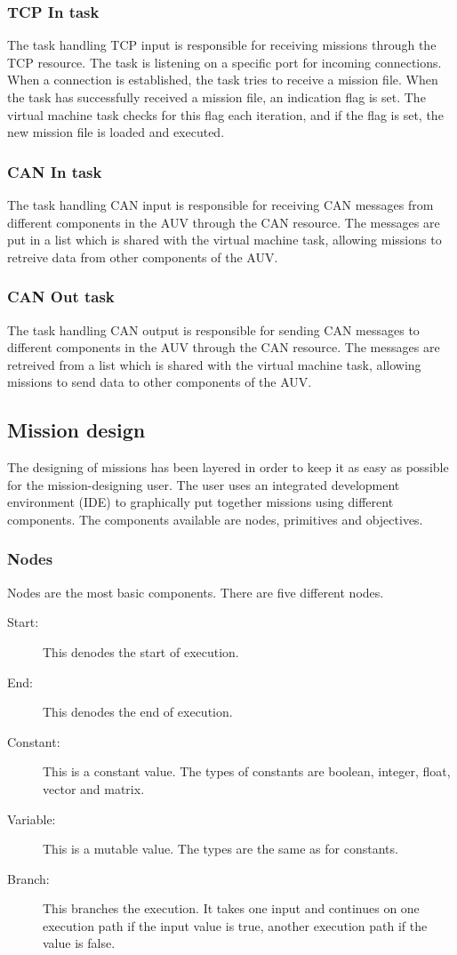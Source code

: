 \subsubsection{TCP In task}
The task handling TCP input is responsible for receiving missions through the TCP resource. The task is listening on a specific port for incoming connections. When a connection is established, the task tries to receive a mission file. When the task has successfully received a mission file, an indication flag is set. The virtual machine task checks for this flag each iteration, and if the flag is set, the new mission file is loaded and executed.

\subsubsection{CAN In task}
The task handling CAN input is responsible for receiving CAN messages from different components in the AUV through the CAN resource. The messages are put in a list which is shared with the virtual machine task, allowing missions to retreive data from other components of the AUV.

\subsubsection{CAN Out task}
The task handling CAN output is responsible for sending CAN messages to different components in the AUV through the CAN resource. The messages are retreived from a list which is shared with the virtual machine task, allowing missions to send data to other components of the AUV.

\subsection{Mission design}
The designing of missions has been layered in order to keep it as easy as possible for the mission-designing user. The user uses an integrated development environment (IDE) to graphically put together missions using different components. The components available are nodes, primitives and objectives.

\subsubsection{Nodes}
Nodes are the most basic components. There are five different nodes.
\begin{description}
\item[Start:] This denodes the start of execution.
\item[End:] This denodes the end of execution.
\item[Constant:] This is a constant value. The types of constants are boolean, integer, float, vector and matrix.
\item[Variable:] This is a mutable value. The types are the same as for constants.
\item[Branch:] This branches the execution. It takes one input and continues on one execution path if the input value is true, another execution path if the value is false.
\end{description}

